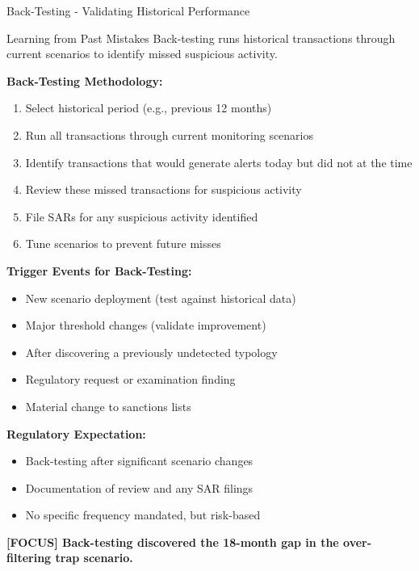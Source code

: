 \documentclass[11pt,a4paper]{beamer}
\newcommand{\examfocus}[1]{\textcolor{orange!80!black}{\textbf{[FOCUS] #1}}}
\begin{document}
	\begin{frame}{Back-Testing - Validating Historical Performance}
	\begin{block}{Learning from Past Mistakes}
		Back-testing runs historical transactions through current scenarios to identify missed suspicious activity.
	\end{block}
	
	\textbf{Back-Testing Methodology:}
	\begin{enumerate}
		\item Select historical period (e.g., previous 12 months)
		\item Run all transactions through current monitoring scenarios
		\item Identify transactions that would generate alerts today but did not at the time
		\item Review these missed transactions for suspicious activity
		\item File SARs for any suspicious activity identified
		\item Tune scenarios to prevent future misses
	\end{enumerate}
	
	\textbf{Trigger Events for Back-Testing:}
	\begin{itemize}
		\item New scenario deployment (test against historical data)
		\item Major threshold changes (validate improvement)
		\item After discovering a previously undetected typology
		\item Regulatory request or examination finding
		\item Material change to sanctions lists
	\end{itemize}
	
	\textbf{Regulatory Expectation:}
	\begin{itemize}
		\item Back-testing after significant scenario changes
		\item Documentation of review and any SAR filings
		\item No specific frequency mandated, but risk-based
	\end{itemize}
	
	\examfocus{Back-testing discovered the 18-month gap in the over-filtering trap scenario.}
	\end{frame}
	
\end{document}
